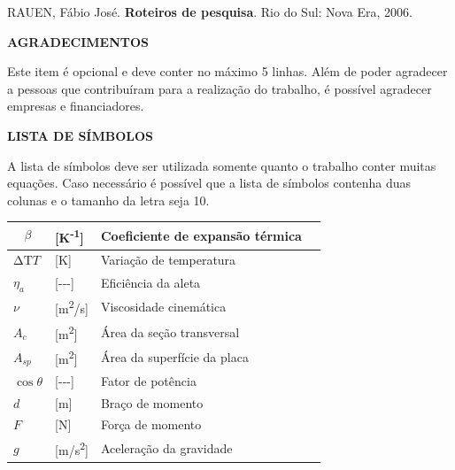 \documentclass[
]{article}
\begin{document}
RAUEN, Fábio José. \textbf{Roteiros de pesquisa}. Rio do Sul: Nova Era,
2006.

\textbf{AGRADECIMENTOS}

Este item é opcional e deve conter no máximo 5 linhas. Além de poder
agradecer a pessoas que contribuíram para a realização do trabalho, é
possível agradecer empresas e financiadores.

\textbf{LISTA DE SÍMBOLOS}

A lista de símbolos deve ser utilizada somente quanto o trabalho conter
muitas equações. Caso necessário é possível que a lista de símbolos
contenha duas colunas e o tamanho da letra seja 10.

\begin{longtable}[]{@{}
  >{\raggedright\arraybackslash}p{}
  >{\raggedright\arraybackslash}p{}
  >{\raggedright\arraybackslash}p{}
  >{\raggedright\arraybackslash}p{}@{}}
\toprule\noalign{}
\begin{minipage}[b]{\linewidth}\raggedright
\[\beta\]
\end{minipage} & \begin{minipage}[b]{\linewidth}\raggedright
{[}K\textsuperscript{-1}{]}
\end{minipage} & \begin{minipage}[b]{\linewidth}\raggedright
Coeficiente de expansão térmica
\end{minipage} & \begin{minipage}[b]{\linewidth}\raggedright
\end{minipage} \\
\midrule\noalign{}
\endhead
\bottomrule\noalign{}
\endlastfoot
\(\mathrm{ΔT}T\) & {[}K{]} & Variação de temperatura & \\
\(\eta_{a}\) & {[}-\/-\/-{]} & Eficiência da aleta & \\
\(\nu\) & {[}m\textsuperscript{2}/s{]} & Viscosidade cinemática & \\
\(A_{c}\) & {[}m\textsuperscript{2}{]} & Área da seção transversal & \\
\(A_{sp}\) & {[}m\textsuperscript{2}{]} & Área da superfície da placa
& \\
\(\cos\theta\) & {[}-\/-\/-{]} & Fator de potência & \\
\(d\) & {[}m{]} & Braço de momento & \\
\(F\) & {[}N{]} & Força de momento & \\
\(g\) & {[}m/s\textsuperscript{2}{]} & Aceleração da gravidade & \\
\end{longtable}
\end{document}
